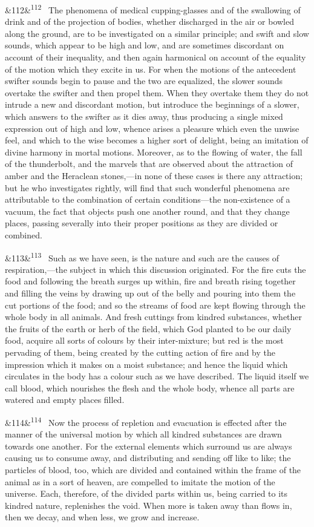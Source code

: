 \documentclass[12pt]{article}
\newcommand{\para}[1][]{\par\noindent\ifx&#1&\else\textsuperscript{\footnotesize #1}~\fi}
\begin{document}
\para[112] The phenomena of medical cupping-glasses and of the swallowing of drink and of the projection of bodies, whether discharged in the air or bowled along the ground, are to be investigated on a similar principle; and swift and slow sounds, which appear to be high and low, and are sometimes discordant on account of their inequality, and then again harmonical on account of the equality of the motion which they excite in us. For when the motions of the antecedent swifter sounds begin to pause and the two are equalized, the slower sounds overtake the swifter and then propel them. When they overtake them they do not intrude a new and discordant motion, but introduce the beginnings of a slower, which answers to the swifter as it dies away, thus producing a single mixed expression out of high and low, whence arises a pleasure which even the unwise feel, and which to the wise becomes a higher sort of delight, being an imitation of divine harmony in mortal motions. Moreover, as to the flowing of water, the fall of the thunderbolt, and the marvels that are observed about the attraction of amber and the Heraclean stones,---in none of these cases is there any attraction; but he who investigates rightly, will find that such wonderful phenomena are attributable to the combination of certain conditions---the non-existence of a vacuum, the fact that objects push one another round, and that they change places, passing severally into their proper positions as they are divided or combined.

\para[113] Such as we have seen, is the nature and such are the causes of respiration,---the subject in which this discussion originated. For the fire cuts the food and following the breath surges up within, fire and breath rising together and filling the veins by drawing up out of the belly and pouring into them the cut portions of the food; and so the streams of food are kept flowing through the whole body in all animals. And fresh cuttings from kindred substances, whether the fruits of the earth or herb of the field, which God planted to be our daily food, acquire all sorts of colours by their inter-mixture; but red is the most pervading of them, being created by the cutting action of fire and by the impression which it makes on a moist substance; and hence the liquid which circulates in the body has a colour such as we have described. The liquid itself we call blood, which nourishes the flesh and the whole body, whence all parts are watered and empty places filled.

\para[114] Now the process of repletion and evacuation is effected after the manner of the universal motion by which all kindred substances are drawn towards one another. For the external elements which surround us are always causing us to consume away, and distributing and sending off like to like; the particles of blood, too, which are divided and contained within the frame of the animal as in a sort of heaven, are compelled to imitate the motion of the universe. Each, therefore, of the divided parts within us, being carried to its kindred nature, replenishes the void. When more is taken away than flows in, then we decay, and when less, we grow and increase.
\end{document}
